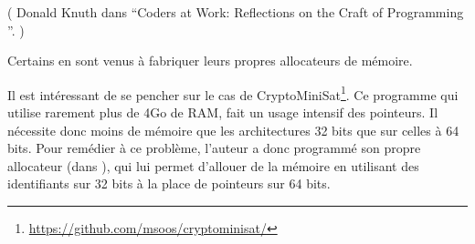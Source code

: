 ( Donald Knuth dans ``Coders at Work: Reflections on the Craft of Programming ''. )

Certains en sont venus à fabriquer leurs propres allocateurs de mémoire.

Il est intéressant de se pencher sur le cas de CryptoMiniSat\footnote{\url{https://github.com/msoos/cryptominisat/}}.
Ce programme qui utilise rarement plus de 4Go de \ac{RAM}, fait un usage intensif des pointeurs.
Il nécessite donc moins de mémoire que les architectures 32 bits que sur celles à 64 bits.
Pour remédier à ce problème, l'auteur a donc programmé son propre allocateur 
(dans ), qui lui permet d'allouer de la mémoire en utilisant des 
identifiants sur 32 bits à la place de pointeurs sur 64 bits.

